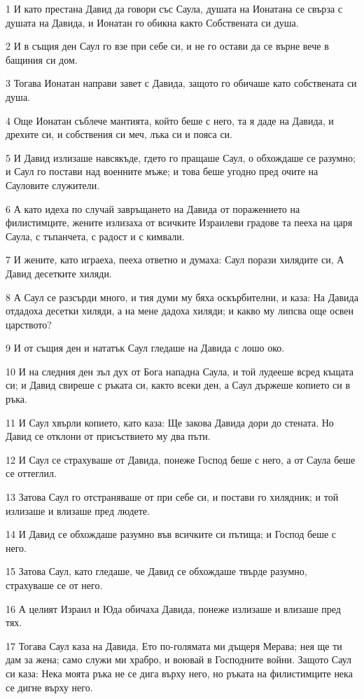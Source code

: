 \par 1 И като престана Давид да говори със Саула, душата на Ионатана се свърза с душата на Давида, и Ионатан го обикна както Собствената си душа.
\par 2 И в същия ден Саул го взе при себе си, и не го остави да се върне вече в бащиния си дом.
\par 3 Тогава Ионатан направи завет с Давида, защото го обичаше като собствената си душа.
\par 4 Още Ионатан съблече мантията, който беше с него, та я даде на Давида, и дрехите си, и собствения си меч, лъка си и пояса си.
\par 5 И Давид излизаше навсякъде, гдето го пращаше Саул, о обхождаше се разумно; и Саул го постави над военните мъже; и това беше угодно пред очите на Сауловите служители.
\par 6 А като идеха по случай завръщането на Давида от поражението на филистимците, жените излизаха от всичките Израилеви градове та пееха на царя Саула, с тъпанчета, с радост и с кимвали.
\par 7 И жените, като играеха, пееха ответно и думаха: Саул порази хилядите си, А Давид десетките хиляди.
\par 8 А Саул се разсърди много, и тия думи му бяха оскърбителни, и каза: На Давида отдадоха десетки хиляди, а на мене дадоха хиляди; и какво му липсва още освен царството?
\par 9 И от същия ден и нататък Саул гледаше на Давида с лошо око.
\par 10 И на следния ден зъл дух от Бога нападна Саула, и той лудееше всред къщата си; и Давид свиреше с ръката си, както всеки ден, а Саул държеше копието си в ръка.
\par 11 И Саул хвърли копието, като каза: Ще закова Давида дори до стената. Но Давид се отклони от присъствието му два пъти.
\par 12 И Саул се страхуваше от Давида, понеже Господ беше с него, а от Саула беше се оттеглил.
\par 13 Затова Саул го отстраняваше от при себе си, и постави го хилядник; и той излизаше и влизаше пред людете.
\par 14 И Давид се обхождаше разумно във всичките си пътища; и Господ беше с него.
\par 15 Затова Саул, като гледаше, че Давид се обхождаше твърде разумно, страхуваше се от него.
\par 16 А целият Израил и Юда обичаха Давида, понеже излизаше и влизаше пред тях.
\par 17 Тогава Саул каза на Давида, Ето по-голямата ми дъщеря Мерава; нея ще ти дам за жена; само служи ми храбро, и воювай в Господните войни. Защото Саул си каза: Нека моята ръка не се дига върху него, но ръката на филистимците нека се дигне върху него.
